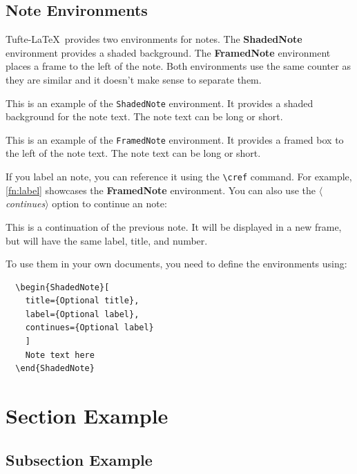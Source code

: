 \documentclass[a4paper]{tufte-handout}
\newcommand{\doccmd}[1]{\texttt{\textbackslash#1}}
\newcommand{\docopt}[1]{\ensuremath{\langle}\textrm{\textit{#1}}\ensuremath{\rangle}}
\newcommand{\docenv}[1]{\textrm{\textbf{#1}}}
\begin{document}
\subsection{Note Environments}

Tufte-\LaTeX\ provides two environments for notes. The \docenv{ShadedNote}
environment provides a shaded background. The \docenv{FramedNote} environment
places a frame to the left of the note. Both environments use the same 
counter as they are similar and it doesn't make sense to separate them.

\begin{ShadedNote}
  This is an example of the \Verb|ShadedNote| environment. It provides a
  shaded background for the note text. The note text can be long or short.
\end{ShadedNote}

\begin{FramedNote}[
  name={Note Title},
  label={fn:label}
  ]
  This is an example of the \Verb|FramedNote| environment. It provides a
  framed box to the left of the note text. The note text can be long or short.
\end{FramedNote}

If you label an note, you can reference it using the \doccmd{cref} command.
For example, \cref{fn:label} showcases the \docenv{FramedNote} environment.
You can also use the \docopt{continues} option to continue an note:

\begin{FramedNote}[continues={fn:label}]
  This is a continuation of the previous note. It will be displayed in a new
  frame, but will have the same label, title, and number.
\end{FramedNote}


To use them in your own documents, you need to define the environments using:

\begin{Verbatim}
  \begin{ShadedNote}[
    title={Optional title}, 
    label={Optional label},
    continues={Optional label}
    ]
    Note text here
  \end{ShadedNote}  
\end{Verbatim}

\section{Section Example}
\subsection{Subsection Example}
\end{document}
